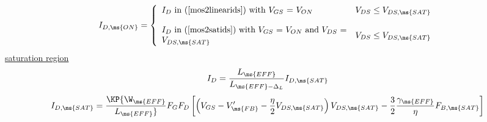 {\begin{equation}
\end{equation}
\begin{equation}
I_{D,\ms{ON}} =  \left\{ \begin{array}{ll}
                  \parbox{3in}{$I_{D}$ in (\ref{mos2linearids})
                               with $V_{GS}$ = $V_{ON}$}
                  & V_{DS} \le V_{DS,\ms{SAT}} \\ \\
                  \parbox{3in}{$I_{D}$ in (\ref{mos2satids})
                               with $V_{GS}$ = $V_{ON}$ and
                               $V_{DS}$ = $V_{DS,\ms{SAT}}$}
                  & V_{DS} \le V_{DS,\ms{SAT}}
                  \end{array} \right. %
\end{equation}
%
%
\underline{saturation region} 
\begin{equation}
I_{D} =   {{L_{\ms{EFF}}}\over{\textstyle L_{\ms{EFF}-\Delta_L}}}
           I_{D,\ms{SAT}}
      \label{mos2satids}
\end{equation}
\begin{equation}
I_{D,\ms{SAT}}  =   \KP {{\W_{\ms{EFF}}}\over{ L_{\ms{EFF}}}} F_G
F_D
           \left[ \left( V_{GS} - V'_{\ms{FB}}
            -{{\eta}\over 2} V_{DS,\ms{SAT}}\right)
       V_{DS,\ms{SAT}}
           -{{\textstyle 3}\over{\textstyle 2}}
           {{\textstyle \gamma_{\ms{EFF}}}\over{\textstyle \eta }}
           F_{B,\ms{SAT}}
           \right]
\end{equation}
}
